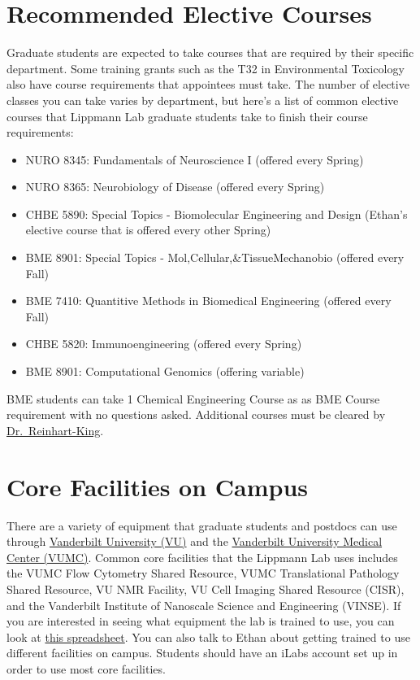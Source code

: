 \documentclass[
]{book}
\begin{document}
\hypertarget{recommended-elective-courses}{%
\section{Recommended Elective Courses}\label{recommended-elective-courses}}

Graduate students are expected to take courses that are required by their specific department. Some training grants such as the T32 in Environmental Toxicology also have course requirements that appointees must take. The number of elective classes you can take varies by department, but here's a list of common elective courses that Lippmann Lab graduate students take to finish their course requirements:

\begin{itemize}
\item
  NURO 8345: Fundamentals of Neuroscience I (offered every Spring)
\item
  NURO 8365: Neurobiology of Disease (offered every Spring)
\item
  CHBE 5890: Special Topics - Biomolecular Engineering and Design (Ethan's elective course that is offered every other Spring)
\item
  BME 8901: Special Topics - Mol,Cellular,\&TissueMechanobio (offered every Fall)
\item
  BME 7410: Quantitive Methods in Biomedical Engineering (offered every Fall)
\item
  CHBE 5820: Immunoengineering (offered every Spring)
\item
  BME 8901: Computational Genomics (offering variable)
\end{itemize}

BME students can take 1 Chemical Engineering Course as as BME Course requirement with no questions asked. Additional courses must be cleared by \href{mailto:cynthia.reinhart-king@VANDERBILT.EDU}{Dr.~Reinhart-King}.

\hypertarget{corefacilities}{%
\section{Core Facilities on Campus}\label{corefacilities}}

There are a variety of equipment that graduate students and postdocs can use through \href{https://www.vanderbilt.edu/cores/cores-facilities.php}{Vanderbilt University (VU)} and the \href{https://www.vumc.org/oor/institutional-research-shared-resources-and-core-facilities}{Vanderbilt University Medical Center (VUMC)}. Common core facilities that the Lippmann Lab uses includes the VUMC Flow Cytometry Shared Resource, VUMC Translational Pathology Shared Resource, VU NMR Facility, VU Cell Imaging Shared Resource (CISR), and the Vanderbilt Institute of Nanoscale Science and Engineering (VINSE). If you are interested in seeing what equipment the lab is trained to use, you can look at \href{https://docs.google.com/spreadsheets/d/1gsTkMHcHbQ4z3y_Iq0_OSRODjhGSvkoRmYmUvWKNb2M/edit?usp=sharing}{this spreadsheet}. You can also talk to Ethan about getting trained to use different facilities on campus. Students should have an iLabs account set up in order to use most core facilities.
\end{document}
